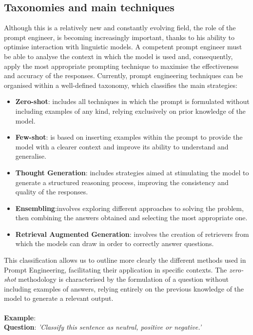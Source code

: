 \subsection{Taxonomies and main techniques}
Although this is a relatively new and constantly evolving field, the role of the prompt engineer, is becoming increasingly important, thanks to his ability to optimise interaction with linguistic models. A competent prompt engineer must be able to analyse the context in which the model is used and, consequently, apply the most appropriate prompting technique to maximise the effectiveness and accuracy of the responses.
Currently, prompt engineering techniques can be organised within a well-defined taxonomy, which classifies the main strategies:\\
\begin{itemize}
    \item \textbf{Zero-shot}: includes all techniques in which the prompt is formulated without including examples of any kind, relying exclusively on prior knowledge of the model.
    \item \textbf{Few-shot}: is based on inserting examples within the prompt to provide the model with a clearer context and improve its ability to understand and generalise.
    \item \textbf{Thought Generation}: includes strategies aimed at stimulating the model to generate a structured reasoning process, improving the consistency and quality of the responses.
    \item  \textbf{Ensembling}:involves exploring different approaches to solving the problem, then combining the answers obtained and selecting the most appropriate one.
    \item \textbf{Retrieval Augmented Generation}: involves the creation of retrievers \cite{Rag} from which the models can draw in order to correctly answer questions.

\end{itemize}
This classification allows us to outline more clearly the different methods used in Prompt Engineering, facilitating their application in specific contexts.
The \textit{zero-shot} methodology is characterised by the formulation of a question without including examples of answers, relying entirely on the previous knowledge of the model to generate a relevant output.\\
\\
\textbf{Example}:\\
\textbf{Question}: \textit{'Classify this sentence as neutral, positive or negative.'}\\
